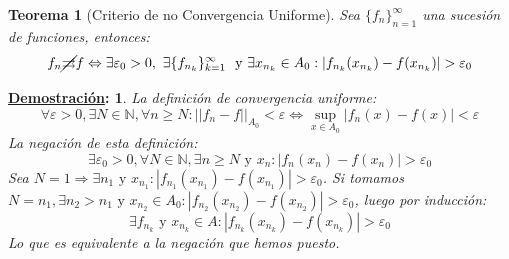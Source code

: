 \documentclass[10pt,a4paper,openright]{book}
\theoremstyle{break}
\newtheorem*{theo}{Teorema}
\newtheorem*{demo}{\underline{Demostración}:}
\begin{document}
\begin{theo}[Criterio de no Convergencia Uniforme]
Sea $\{f_n\}_{n=1}^\infty$ una sucesión de funciones, entonces:
$$f_n\cancel{\rightrightarrows} f \Leftrightarrow \exists \varepsilon_0 > 0, \ \exists \{f_{n_k}\}_{k=1}^\infty\  \mbox{ y } \exists x_{n_k} \in A_0: |f_{n_k} (x_{n_k}) - f(x_{n_k}) | > \varepsilon_0$$
\end{theo}
\begin{demo}
La definición de convergencia uniforme:
$$\forall \varepsilon > 0, \exists N \in \mathbb{N}, \forall n \geq N : ||f_n - f||_{A_0} < \varepsilon \Leftrightarrow \underset{x \in A_0}{\sup} |f_n(x) - f(x)| < \varepsilon$$
La negación de esta definición:
$$\exists \varepsilon_0 > 0, \forall N \in \mathbb{N},  \exists n \geq N  \mbox{ y } x_n: |f_n(x_n) - f(x_n)| > \varepsilon_0$$
Sea $N = 1 \Rightarrow \exists n_1 \mbox{ y } x_{n_1} :  |f_{n_1} (x_{n_1}) - f(x_{n_1})| > \varepsilon_0$. Si tomamos $N=n_1, \exists n_2 > n_1 \mbox{ y } x_{n_2} \in A_0 : |f_{n_2} (x_{n_2}) - f(x_{n_2})| > \varepsilon_0$, luego por inducción:
$$\exists f_{n_k} \mbox{ y } x_{n_k}\in A : |f_{n_k} (x_{n_k}) - f(x_{n_k})| > \varepsilon_0$$
Lo que es equivalente a la negación que hemos puesto.
\end{demo}
\end{document}
